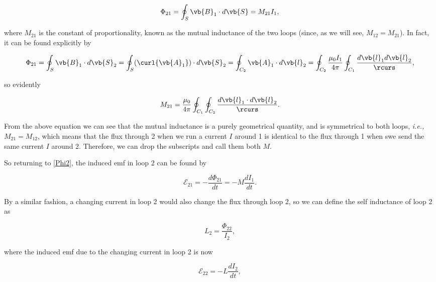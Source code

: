\documentclass[english,a4paper,12pt]{report}
\begin{document}
\begin{equation} \label{Phi2} 
    \Phi _{21} = \oint_{S} \vb{B} _{1} \cdot d\vb{S} = M_{21} I_1 ,    
\end{equation}

where \(M_{21} \) is the constant of proportionality, known as the mutual inductance of the two loops (since, as we will see, \(M_{12} = M_{21}  \)). In fact, it can be found explicitly by

\begin{equation}
    \Phi _{21} = \oint_{S} \vb{B} _{1} \cdot d \vb{S} _{2} = \oint_{S} (\curl{\vb{A} _{1} }  ) \cdot d\vb{S} _{2} = \oint_{C_2 } \vb{A} _{1} \cdot d \vb{l} _{2} = \oint_{C_2 } \frac{\mu _{0} I_1  }{4\pi }\oint_{C_1 } \frac{d \vb{l} _{1} d \vb{l} _{2}  }{\rcurs },            
\end{equation}

so evidently

\begin{equation}
    M_{21} = \frac{\mu _{0} }{4 \pi } \oint_{C_1 }\oint_{C_2 } \frac{d \vb{l} _{1} \cdot d \vb{l} _{2} }{\rcurs }.     
\end{equation}

From the above equation we can see that the mutual inductance is a purely geometrical quantity, and is symmetrical to both loops, \textit{i.e.,} \(M_{21} = M_{12}  \), which means that the flux through 2 when we run a current \(I\) around 1 is identical to the flux through 1 when swe send the same current \(I\) around 2. Therefore, we can drop the subscripts and call them both \(M\).

So returning to \cref{Phi2}, the induced emf in loop 2 can be found by 

\begin{equation}
    \mathcal{E}_{21} = - \frac{d\Phi _{21} }{dt} = - M \frac{dI_1 }{dt}.  
\end{equation}

By a similar fashion, a changing current in loop 2 would also change the flux through loop 2, so we can define the self inductance of loop 2 as 

\begin{equation}
    L_2  = \frac{\Phi _{22}  }{I_2 }, 
\end{equation}

where the induced emf due to the changing current in loop 2 is now

\begin{equation}
    \mathcal{E}_{22} = - L\frac{dI_2 }{dt},  
\end{equation}
\end{document}
